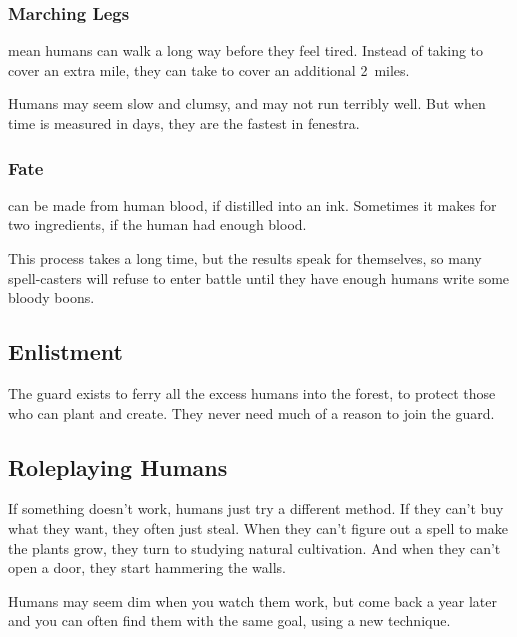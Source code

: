 \begin{multicols}{2}
\subsubsection[Marching Legs: every \glsentrytext{ep} spent to march adds 2 miles]{Marching Legs}
\label{humanInheritance}
mean humans can walk a long way before they feel tired.
Instead of taking  to cover an extra mile, they can take  to cover an additional 2~miles.

Humans may seem slow and clumsy, and may not run terribly well.
But when time is measured in days, they are the fastest in \gls{fenestra}.

\subsubsection{Fate }
can be made from human blood, if distilled into an ink.
Sometimes it makes for two \glspl{ingredient}, if the human had enough blood.

This process takes a long time, but the results speak for themselves, so many spell-casters will refuse to enter battle until they have enough humans write some bloody \glspl{boon}.

\subsection{Enlistment}

The \gls{guard} exists to ferry all the excess humans into the forest, to protect those who can plant and create.
They never need much of a reason to join the guard.

\subsection{Roleplaying Humans}

If something doesn't work, humans just try a different method.
If they can't buy what they want, they often just steal.
When they can't figure out a spell to make the plants grow, they turn to studying natural cultivation.
And when they can't open a door, they start hammering the walls.

Humans may seem dim when you watch them work, but come back a year later and you can often find them with the same goal, using a new technique.

\end{multicols}

